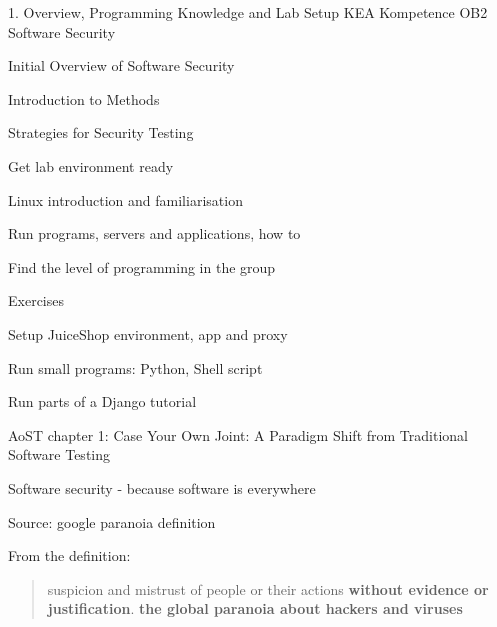 \documentclass[Screen16to9,17pt]{foils}
\begin{document}
\mytitlepage
{1. Overview, Programming Knowledge and Lab Setup}
{KEA Kompetence OB2 Software Security}


\begin{list1}
\item Initial Overview of Software Security
\begin{list2}
\item Introduction to Methods
\item Strategies for Security Testing
\end{list2}
\item Get lab environment ready
\begin{list2}
\item Linux introduction and familiarisation
\item Run programs, servers and applications, how to
\item Find the level of programming in the group
\end{list2}

\item Exercises
\begin{list2}
\item Setup JuiceShop environment, app and proxy
\item Run small programs: Python, Shell script
\item Run parts of a Django tutorial
\end{list2}
\end{list1}


\begin{list1}
\item AoST chapter 1: Case Your Own Joint: A Paradigm Shift from Traditional Software Testing
\end{list1}



\begin{list1}
\item Software security - because software is everywhere
\end{list1}



Source: google paranoia definition


From the definition:
\begin{quote}
suspicion and mistrust of people or their actions {\bf without evidence or justification}.
{\bf the global paranoia about hackers and viruses}
\end{quote}
\end{document}
